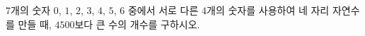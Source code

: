 $7$개의 숫자 $0$, $1$, $2$, $3$, $4$, $5$, $6$ 중에서 서로 다른 $4$개의 숫자를 사용하여 네 자리 자연수를 만들 때, $4500$보다 큰 수의 개수를 구하시오.
